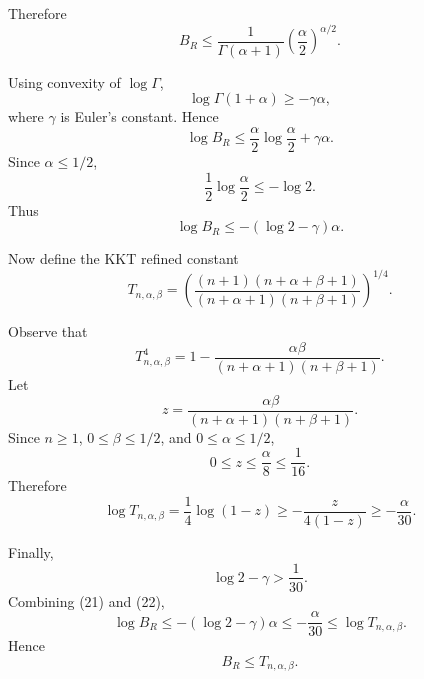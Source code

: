 \documentclass[11pt]{article}
\begin{document}
Therefore
\begin{equation}
B_R
\le
\frac{1}{\Gamma(\alpha+1)}
\left(\frac{\alpha}{2}\right)^{\alpha/2}.
\tag{20}
\end{equation}

Using convexity of \(\log\Gamma\),
\begin{equation*}
\log\Gamma(1+\alpha)\ge -\gamma\alpha,
\end{equation*}
where \(\gamma\) is Euler's constant. Hence
\begin{equation*}
\log B_R
\le
\frac{\alpha}{2}\log\frac{\alpha}{2}
+\gamma\alpha.
\end{equation*}
Since \(\alpha\le1/2\),
\begin{equation*}
\frac12\log\frac{\alpha}{2}
\le
-\log2.
\end{equation*}
Thus
\begin{equation}
\log B_R
\le
-(\log2-\gamma)\alpha.
\tag{21}
\end{equation}

Now define the KKT refined constant
\begin{equation*}
T_{n,\alpha,\beta}
=
\left(
\frac{(n+1)(n+\alpha+\beta+1)}
{(n+\alpha+1)(n+\beta+1)}
\right)^{1/4}.
\end{equation*}

Observe that
\begin{equation*}
T_{n,\alpha,\beta}^4
=
1-
\frac{\alpha\beta}{(n+\alpha+1)(n+\beta+1)}.
\end{equation*}
Let
\begin{equation*}
z=
\frac{\alpha\beta}{(n+\alpha+1)(n+\beta+1)}.
\end{equation*}
Since \(n\ge1\), \(0\le\beta\le1/2\), and \(0\le\alpha\le1/2\),
\begin{equation*}
0\le z\le \frac{\alpha}{8}\le\frac1{16}.
\end{equation*}
Therefore
\begin{equation}
\log T_{n,\alpha,\beta}
=
\frac14\log(1-z)
\ge
-\frac{z}{4(1-z)}
\ge
-\frac{\alpha}{30}.
\tag{22}
\end{equation}

Finally,
\begin{equation*}
\log2-\gamma>\frac1{30}.
\end{equation*}
Combining (21) and (22),
\begin{equation*}
\log B_R
\le
-(\log2-\gamma)\alpha
\le
-\frac{\alpha}{30}
\le
\log T_{n,\alpha,\beta}.
\end{equation*}
Hence
\begin{equation}
\boxed{
B_R\le T_{n,\alpha,\beta}.
}
\tag{23}
\end{equation}
\end{document}
